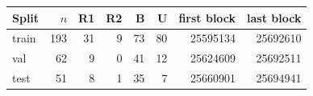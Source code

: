 \begin{tabular}{lrrrrrrr}
\toprule
Split & $n$ & R1 & R2 & B & U & first block & last block \\
\midrule
train & 193 & 31 & 9 & 73 & 80 & 25595134 & 25692610 \\
val & 62 & 9 & 0 & 41 & 12 & 25624609 & 25692511 \\
test & 51 & 8 & 1 & 35 & 7 & 25660901 & 25694941 \\
\bottomrule
\end{tabular}
